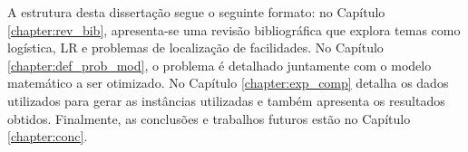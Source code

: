 A estrutura desta dissertação segue o seguinte formato: no Capítulo \ref{chapter:rev_bib}, apresenta-se uma revisão bibliográfica que explora temas como logística, LR e  problemas de localização de facilidades. No Capítulo \ref{chapter:def_prob_mod}, o problema é detalhado juntamente com o modelo matemático a ser otimizado. No Capítulo \ref{chapter:exp_comp} detalha os dados utilizados para gerar as instâncias utilizadas e também apresenta os resultados obtidos. Finalmente, as conclusões e trabalhos futuros estão no Capítulo \ref{chapter:conc}.
